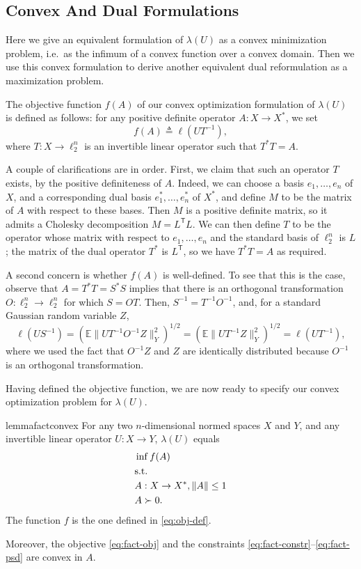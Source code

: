 \documentclass[11pt]{article}
\newcommand{\E}{\mathbb{E}}
\newcommand{\T}{\mathsf T}
\newcommand{\eqdef}{\triangleq}
\begin{document}
\subsection{Convex And Dual Formulations}
\label{sect:fact-conv}

Here we give an equivalent formulation of $\lambda(U)$ as a convex
minimization problem, i.e.~as the infimum of a convex function over a
convex domain. Then we use this convex formulation to derive another
equivalent dual reformulation as a maximization problem.


The objective function $f(A)$ of our convex optimization formulation of
$\lambda(U)$ is defined as follows: for any positive definite
operator $A:X \to X^*$, we set
\begin{equation}
  \label{eq:obj-def}
  f(A) \eqdef \ell(UT^{-1}),
\end{equation}
where $T:X \to \ell_2^n$ is an invertible linear operator such that $T^*T = A$. 

A couple of clarifications are in order. First, we claim that such an
operator $T$ exists, by the positive definiteness of $A$. Indeed, we
can choose a basis $e_1, \ldots, e_n$ of $X$, and a corresponding dual
basis $e_1^*, \ldots, e_n^*$ of $X^*$, and define $M$ to be the matrix
of $A$ with respect to these bases. Then $M$ is a positive definite
matrix, so it admits a Cholesky decomposition $M = L^\T L$. We can
then define $T$ to be the operator whose matrix with respect to $e_1,
\ldots, e_n$ and the standard basis of $\ell_2^n$ is $L$; the matrix
of the dual operator $T^*$ is $L^\T$, so we have $T^*T = A$ as required.

A second concern is whether $f(A)$ is well-defined. To see that this
is the case, observe that $A = T^*T = S^*S$ implies that there is an
orthogonal transformation $O:\ell_2^n \to \ell_2^n$ for which $S =
OT$.  Then, $S^{-1} = T^{-1}O^{-1}$, and, for a standard Gaussian
random variable $Z$,
\[
\ell(US^{-1}) = (\E\|UT^{-1}O^{-1}Z\|_Y^2)^{1/2} =
(\E\|UT^{-1}Z\|_Y^2)^{1/2}
= \ell(UT^{-1}),
\]
where we used the fact that $O^{-1}Z$ and $Z$ are identically
distributed because $O^{-1}$ is an orthogonal transformation. 

Having defined the objective function, we are now ready to specify our
convex optimization problem for $\lambda(U)$.
\begin{restatable}{lemma}{factconvex}
  \label{lm:fact-convex}
  For any two $n$-dimensional normed spaces $X$ and $Y$, and any
  invertible linear operator $U:X \to Y$, $\lambda(U)$ equals
  \begin{align}
    &\inf  f(A)  \label{eq:fact-obj}\\
    &\text{s.t.}\notag\\
    &A: X \to X^*,\|A\| \le 1\label{eq:fact-constr}\\
    &A \succ 0.\label{eq:fact-psd}
  \end{align}
  The function $f$ is the one defined in \eqref{eq:obj-def}.

  Moreover, the objective \eqref{eq:fact-obj} and the constraints
  \eqref{eq:fact-constr}--\eqref{eq:fact-psd} are convex in $A$.
\end{restatable}
\end{document}
